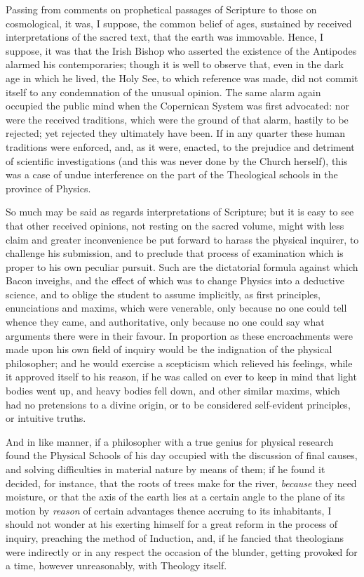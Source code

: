 Passing from comments on prophetical passages of Scripture to those
on cosmological, it was, I suppose, the common belief of ages,
sustained by received interpretations of the sacred text, that the
earth was immovable. Hence, I suppose, it was that the Irish Bishop
who asserted the existence of the Antipodes alarmed his
contemporaries; though it is well to observe that, even in the dark
age in which he lived, the Holy See, to which reference was made, did
not commit itself to any condemnation of the unusual opinion. The same
alarm again occupied the public mind when the Copernican System
was first advocated: nor were the received traditions, which were the
ground of that alarm, hastily to be rejected; yet rejected they
ultimately have been. If in any quarter these human traditions were
enforced, and, as it were, enacted, to the prejudice and detriment of
scientific investigations (and this was never done by the Church
herself), this was a case of undue interference on the part of the
Theological schools in the province of Physics.

So much may be said as regards interpretations of Scripture; but it
is easy to see that other received opinions, not resting on the sacred
volume, might with less claim and greater inconvenience be put forward
to harass the physical inquirer, to challenge his submission, and to
preclude that process of examination which is proper to his own
peculiar pursuit. Such are the dictatorial formula against which Bacon
inveighs, and the effect of which was to change Physics into a
deductive science, and to oblige the student to assume implicitly, as
first principles, enunciations and maxims, which were venerable, only
because no one could tell whence they came, and authoritative, only
because no one could say what arguments there were in their favour. In
proportion as these encroachments were made upon his own field of
inquiry would be the indignation of the physical philosopher; and he
would exercise a scepticism which relieved his feelings, while it
approved itself to his reason, if he was called on ever to keep in
mind that light bodies went up, and heavy bodies fell down, and other
similar maxims, which had no pretensions to a divine origin, or to be
considered self-evident principles, or intuitive truths.

And in like manner, if a philosopher with a true genius for
physical research found the Physical Schools of his day occupied
with the discussion of final causes, and solving difficulties in
material nature by means of them; if he found it decided, for
instance, that the roots of trees make for the river, \emph{because}
they need moisture, or that the axis of the earth lies at a certain
angle to the plane of its motion by \emph{reason} of certain
advantages thence accruing to its inhabitants, I should not wonder at
his exerting himself for a great reform in the process of inquiry,
preaching the method of Induction, and, if he fancied that theologians
were indirectly or in any respect the occasion of the blunder, getting
provoked for a time, however unreasonably, with Theology itself.

